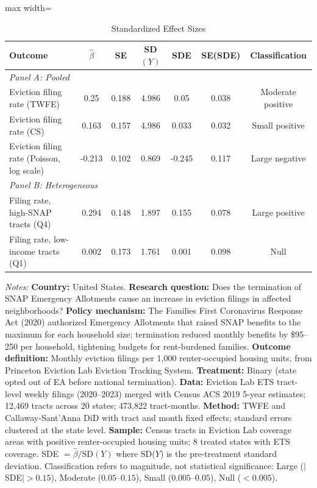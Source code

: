 \begin{table}[htbp]
\centering
\caption{Standardized Effect Sizes}
\label{tab:sde}
\begin{adjustbox}{max width=\textwidth}
\begin{tabular}{lcccccc}
\toprule
Outcome & $\hat{\beta}$ & SE & SD$(Y)$ & SDE & SE(SDE) & Classification \\
\midrule
\multicolumn{7}{l}{\textit{Panel A: Pooled}} \\
Eviction filing rate (TWFE) & 0.25 & 0.188 & 4.986 & 0.05 & 0.038 & Moderate positive \\
Eviction filing rate (CS) & 0.163 & 0.157 & 4.986 & 0.033 & 0.032 & Small positive \\
Eviction filing rate (Poisson, log scale) & -0.213 & 0.102 & 0.869 & -0.245 & 0.117 & Large negative \\
\midrule
\multicolumn{7}{l}{\textit{Panel B: Heterogeneous}} \\
Filing rate, high-SNAP tracts (Q4) & 0.294 & 0.148 & 1.897 & 0.155 & 0.078 & Large positive \\
Filing rate, low-income tracts (Q1) & 0.002 & 0.173 & 1.761 & 0.001 & 0.098 & Null \\
\bottomrule
\end{tabular}
\end{adjustbox}
\begin{tablenotes}
\small
\item \textit{Notes:} \textbf{Country:} United States. \textbf{Research question:} Does the termination of SNAP Emergency Allotments cause an increase in eviction filings in affected neighborhoods? \textbf{Policy mechanism:} The Families First Coronavirus Response Act (2020) authorized Emergency Allotments that raised SNAP benefits to the maximum for each household size; termination reduced monthly benefits by \$95--250 per household, tightening budgets for rent-burdened families. \textbf{Outcome definition:} Monthly eviction filings per 1,000 renter-occupied housing units, from Princeton Eviction Lab Eviction Tracking System. \textbf{Treatment:} Binary (state opted out of EA before national termination). \textbf{Data:} Eviction Lab ETS tract-level weekly filings (2020--2023) merged with Census ACS 2019 5-year estimates; 12,469 tracts across 20 states; 473,822 tract-months. \textbf{Method:} TWFE and Callaway-Sant'Anna DiD with tract and month fixed effects; standard errors clustered at the state level. \textbf{Sample:} Census tracts in Eviction Lab coverage areas with positive renter-occupied housing units; 8 treated states with ETS coverage. SDE $= \hat{\beta} / \text{SD}(Y)$ where SD($Y$) is the pre-treatment standard deviation. Classification refers to magnitude, not statistical significance: Large ($|$SDE$| > 0.15$), Moderate ($0.05$--$0.15$), Small ($0.005$--$0.05$), Null ($< 0.005$).
\end{tablenotes}
\end{table}

